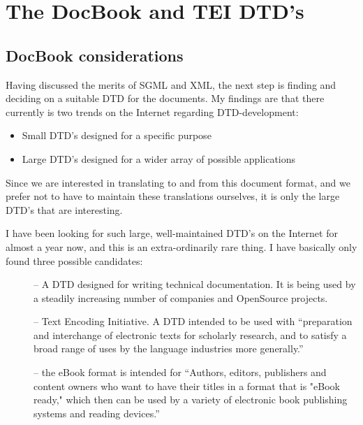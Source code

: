 
\chapter{The DocBook and TEI DTD's}

\section{DocBook considerations}
\label{sec:docbook}

Having discussed the merits of SGML and XML, the next step is finding
and deciding on a suitable DTD for the documents.  My findings are
that there currently is two trends on the Internet regarding
DTD-development:

\begin{itemize}
\item Small DTD's designed for a specific purpose
\item Large DTD's designed for a wider array of possible applications
\end{itemize}

Since we are interested in translating to and from this document
format, and we prefer not to have to maintain these translations
ourselves, it is only the large DTD's that are interesting.

I have been looking for such large, well-maintained DTD's on the
Internet for almost a year now, and this is an extra-ordinarily rare
thing.  I have basically only found three possible candidates:

\begin{description}
\item[] -- A DTD designed for
writing technical documentation.  It is being used by a steadily
increasing number of companies and OpenSource projects.


\item[] -- Text Encoding
Initiative.  A DTD intended to be used with ``preparation and
interchange of electronic texts for scholarly research, and to satisfy
a broad range of uses by the language industries more generally.''

\item[] -- the eBook
  format is intended for ``Authors, editors, publishers and content
  owners who want to have their titles in a format that is "eBook
  ready," which then can be used by a variety of electronic book
  publishing systems and reading devices.''
\end{description}

